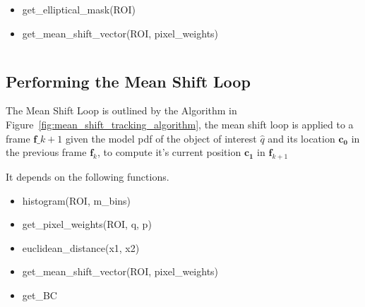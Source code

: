 \begin{itemize}
    \item get\_elliptical\_mask(ROI)
    \item get\_mean\_shift\_vector(ROI, pixel\_weights)
\end{itemize}

\begin{lstlisting}

\end{lstlisting}

\subsection{Performing the Mean Shift Loop}
The Mean Shift Loop is outlined by the Algorithm in
Figure~\ref{fig:mean_shift_tracking_algorithm}, the mean shift loop is
applied to a frame $\mathbf{f}\_{k+1}$ given the model pdf of the object of
interest $\hat{q}$ and its location $\mathbf{c_0}$ in the previous frame
$\mathbf{f}_{k}$, to compute it's current position $\mathbf{c_1}$ in
$\mathbf{f}_{k+1}$

It depends on the following functions.

\begin{itemize}
    \item histogram(ROI, m\_bins)
    \item get\_pixel\_weights(ROI, q, p)
    \item euclidean\_distance(x1, x2)
    \item get\_mean\_shift\_vector(ROI, pixel\_weights)
    \item get\_BC
\end{itemize}



